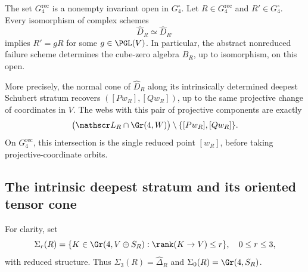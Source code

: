 \begin{theorem}
\label{thm:generic-intrinsic-web}
The set \(G_4^{\mathrm{rec}}\) is a nonempty invariant open in
\(G_4^\circ\).  Let \(R\in G_4^{\mathrm{rec}}\) and
\(R'\in G_4^\circ\).  Every isomorphism of complex schemes
\[
 \widehat D_R\simeq\widehat D_{R'}
\]
implies \(R'=gR\) for some \(g\in\PGL(V)\).  In particular,
the abstract nonreduced failure scheme determines the cube-zero
algebra \(B_R\), up to isomorphism, on this open.

More precisely, the normal cone of \(\widehat D_R\) along its
intrinsically determined deepest Schubert stratum recovers
\(([Pw_R],[Qw_R])\), up to the same projective change of coordinates
in \(V\).  The webs with this pair of projective components are
exactly
\begin{equation}\label{eq:exact-plucker-pencil}
 \bigl(\mathscr L_R\cap\Gr(4,W)\bigr)
 \setminus\{[Pw_R],[Qw_R]\}.
\end{equation}
On \(G_4^{\mathrm{rec}}\), this intersection is the single
reduced point \([w_R]\), before taking projective-coordinate
orbits.
\end{theorem}

\subsection{The intrinsic deepest stratum and its oriented tensor cone}

For clarity, set
\[
 \Sigma_r(R)=\{K\in\Gr(4,V\oplus S_R):
                    \rank(K\to V)\le r\},\quad 0\le r\le3,
\]
with reduced structure.  Thus \(\Sigma_3(R)=\widehat\Delta_R\)
and \(\Sigma_0(R)=\Gr(4,S_R)\).


